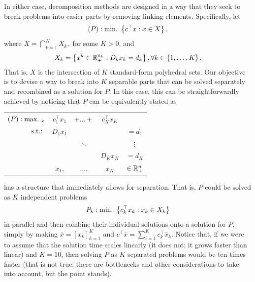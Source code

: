 In either case, decomposition methods are designed in a way that they seek to break problems into easier parts by removing linking elements. Specifically, let 
%
\begin{equation*}
	(P) : \mathop{\text{min.~}} \left\{ c^\top x : x \in X \right \},
\end{equation*}
%
where $X = \bigcap_{k=1}^K X_k,$ for some $K > 0$, and 
%
\begin{equation*}
	X_k = \left\{ x^k \in \mathbb{R}_+^{n_k} : D_kx_k = d_k \right \}, \forall k \in \left\{ 1,\dots,K \right \}.	
\end{equation*}
%
That is, $X$ is the intersection of $K$ standard-form polyhedral sets. Our objective is to devise a way to break into $K$ separable parts that can be solved separately and recombined as a solution for $P$. In this case, this can be straightforwardly achieved by noticing that $P$ can be equivalently stated as 
%
\begin{center}
    \begin{tabular}{rcccc}
	$(P): \mathop{\text{max.~}}_x$ & $c_1^\top x_1$ & $+\dots+$ & $c_K^\top x_K$ & \\
	        $\mathop{\text{s.t.:~}}$  & $D_1x_1$ &           &          & $= d_1$ \\
	               &          & $\ddots$  &          & $\vdots$ \\
	               &          &           & $D_Kx_K$ & $= d_K$ \\
	               &  $x_1$,  & $\dots$,  & $x_K$    & $\in \mathbb{R}^n_+$ 
	\end{tabular}
\end{center}
%
has a structure that immediately allows for separation. That is, $P$ could be solved as $K$ independent problems 
%
\begin{equation*}
	P_k : \mathop{\text{min.~}} \left\{ c_k^\top x_k : x_k \in X_k \right \}	
\end{equation*}
%
in parallel and then combine their individual solutions onto a solution for $P$, simply by making $\overline{x} = [x_k]_{k=1}^K$ and $c^\top \overline{x} = \sum_{i=1}^K c_k^\top \overline{x}_k$. Notice that, if we were to assume that the solution time scales linearly (it does not; it grows faster than linear) and $K=10$, then solving $P$ as $K$ separated problems would be ten times faster (that is not true; there are bottlenecks and other considerations to take into account, but the point stands). 

